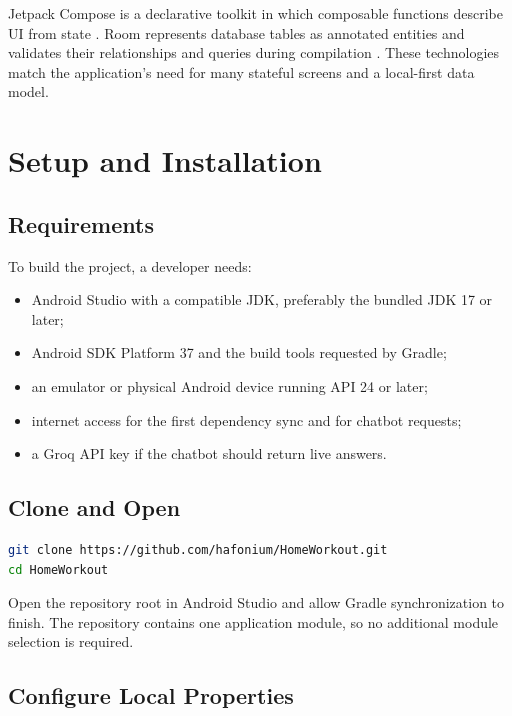 Jetpack Compose is a declarative toolkit in which composable functions describe UI from state \cite{compose}. Room represents database tables as annotated entities and validates their relationships and queries during compilation \cite{room}. These technologies match the application's need for many stateful screens and a local-first data model.

\section{Setup and Installation}

\subsection{Requirements}

To build the project, a developer needs:

\begin{itemize}
    \item Android Studio with a compatible JDK, preferably the bundled JDK 17 or later;
    \item Android SDK Platform 37 and the build tools requested by Gradle;
    \item an emulator or physical Android device running API 24 or later;
    \item internet access for the first dependency sync and for chatbot requests;
    \item a Groq API key if the chatbot should return live answers.
\end{itemize}

\subsection{Clone and Open}

\begin{lstlisting}[language=bash]
git clone https://github.com/hafonium/HomeWorkout.git
cd HomeWorkout
\end{lstlisting}

Open the repository root in Android Studio and allow Gradle synchronization to finish. The repository contains one application module, so no additional module selection is required.

\subsection{Configure Local Properties}

